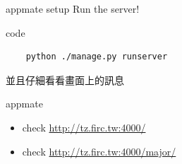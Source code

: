 \documentclass{beamer}
\begin{document}
\begin{frame}[fragile]{appmate setup}
  Run the server!
  \begin{block}{code}
  \begin{verbatim}
    python ./manage.py runserver
  \end{verbatim}
  \end{block}

  並且仔細看看畫面上的訊息
\end{frame}

\begin{frame}{appmate}
  \begin{itemize}
    \item check \url{http://tz.firc.tw:4000/}

    \item check \url{http://tz.firc.tw:4000/major/}
  \end{itemize}
\end{frame}
\end{document}
